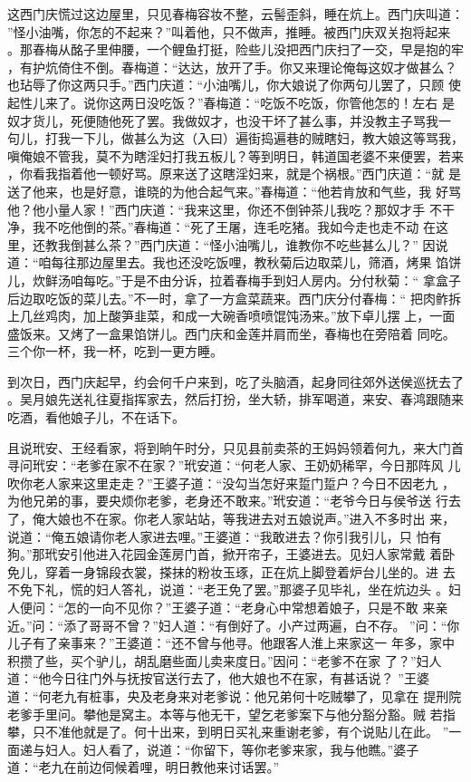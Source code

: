 这西门庆慌过这边屋里，只见春梅容妆不整，云髻歪斜，睡在炕上。西门庆叫道：
”怪小油嘴，你怎的不起来？”叫着他，只不做声，推睡。被西门庆双关抱将起来
。那春梅从酩子里伸腰，一个鲤鱼打挺，险些儿没把西门庆扫了一交，早是抱的牢
，有护炕倚住不倒。春梅道：“达达，放开了手。你又来理论俺每这奴才做甚么？
也玷辱了你这两只手。”西门庆道：“小油嘴儿，你大娘说了你两句儿罢了，只顾
使起性儿来了。说你这两日没吃饭？”春梅道：“吃饭不吃饭，你管他怎的！左右
是奴才货儿，死便随他死了罢。我做奴才，也没干坏了甚么事，并没教主子骂我一
句儿，打我一下儿，做甚么为这（入曰）遍街捣遍巷的贼瞎妇，教大娘这等骂我，
嗔俺娘不管我，莫不为瞎淫妇打我五板儿？等到明日，韩道国老婆不来便罢，若来
，你看我指着他一顿好骂。原来送了这瞎淫妇来，就是个祸根。”西门庆道：“就
是送了他来，也是好意，谁晓的为他合起气来。”春梅道：“他若肯放和气些，我
好骂他？他小量人家！”西门庆道：“我来这里，你还不倒钟茶儿我吃？那奴才手
不干净，我不吃他倒的茶。”春梅道：“死了王屠，连毛吃猪。我如今走也走不动
在这里，还教我倒甚么茶？”西门庆道：“怪小油嘴儿，谁教你不吃些甚么儿？”
因说道：“咱每往那边屋里去。我也还没吃饭哩，教秋菊后边取菜儿，筛酒，烤果
馅饼儿，炊鲜汤咱每吃。”于是不由分诉，拉着春梅手到妇人房内。分付秋菊：“
拿盒子后边取吃饭的菜儿去。”不一时，拿了一方盒菜蔬来。西门庆分付春梅：“
把肉鲊拆上几丝鸡肉，加上酸笋韭菜，和成一大碗香喷喷馄饨汤来。”放下卓儿摆
上，一面盛饭来。又烤了一盒果馅饼儿。西门庆和金莲并肩而坐，春梅也在旁陪着
同吃。三个你一杯，我一杯，吃到一更方睡。

到次日，西门庆起早，约会何千户来到，吃了头脑酒，起身同往郊外送侯巡抚去了
。吴月娘先送礼往夏指挥家去，然后打扮，坐大轿，排军喝道，来安、春鸿跟随来
吃酒，看他娘子儿，不在话下。

且说玳安、王经看家，将到晌午时分，只见县前卖茶的王妈妈领着何九，来大门首
寻问玳安：“老爹在家不在家？”玳安道：“何老人家、王奶奶稀罕，今日那阵风
儿吹你老人家来这里走走？”王婆子道：“没勾当怎好来踅门踅户？今日不因老九
，为他兄弟的事，要央烦你老爹，老身还不敢来。”玳安道：“老爷今日与侯爷送
行去了，俺大娘也不在家。你老人家站站，等我进去对五娘说声。”进入不多时出
来，说道：“俺五娘请你老人家进去哩。”王婆道：“我敢进去？你引我引儿，只
怕有狗。”那玳安引他进入花园金莲房门首，掀开帘子，王婆进去。见妇人家常戴
着卧免儿，穿着一身锦段衣裳，搽抹的粉妆玉琢，正在炕上脚登着炉台儿坐的。进
去不免下礼，慌的妇人答礼，说道：“老王免了罢。”那婆子见毕礼，坐在炕边头
。妇人便问：“怎的一向不见你？”王婆子道：“老身心中常想着娘子，只是不敢
来亲近。”问：“添了哥哥不曾？”妇人道：“有倒好了。小产过两遍，白不存。
”问：“你儿子有了亲事来？”王婆道：“还不曾与他寻。他跟客人淮上来家这一
年多，家中积攒了些，买个驴儿，胡乱磨些面儿卖来度日。”因问：“老爹不在家
了？”妇人道：“他今日往门外与抚按官送行去了，他大娘也不在家，有甚话说？
”王婆道：“何老九有桩事，央及老身来对老爹说：他兄弟何十吃贼攀了，见拿在
提刑院老爹手里问。攀他是窝主。本等与他无干，望乞老爹案下与他分豁分豁。贼
若指攀，只不准他就是了。何十出来，到明日买礼来重谢老爹，有个说贴儿在此。
”一面递与妇人。妇人看了，说道：“你留下，等你老爹来家，我与他瞧。”婆子
道：“老九在前边伺候着哩，明日教他来讨话罢。”

